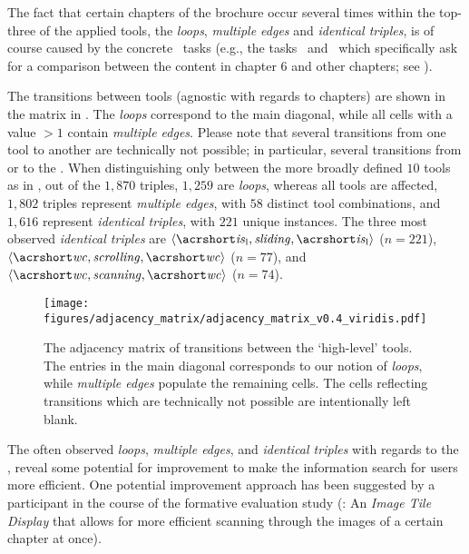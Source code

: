 The fact that certain chapters of the brochure occur several times within the top-three of the applied tools, the \emph{loops}, \emph{multiple edges} and \emph{identical triples}, is of course caused by the concrete \cwt\ tasks (e.g., the tasks \taskTibThree\ and \taskIsTwo\ which specifically ask for a comparison between the content in chapter 6 and other chapters; see ). 


The transitions between tools (agnostic with regards to chapters) are shown in the matrix in . 
%
The \emph{loops} correspond to the main diagonal, while all cells with a value $> 1$ contain \emph{multiple edges}. 
%
Please note that several transitions from one tool to another are technically not possible; in particular, several transitions from or to the \isL. 
%
When distinguishing only between the more broadly defined $10$ tools as in , out of the $1,870$ triples, $1,259$ are \emph{loops}, whereas all tools are affected, $1,802$ triples represent \emph{multiple edges}, with $58$ distinct tool combinations, and $1,616$ represent \emph{identical triples}, with $221$ unique instances. 
%
The three most observed \emph{identical triples} are 
$\langle \mathit{\isL}, \mathit{sliding}, \mathit{\isL} \rangle$ ($n = 221$), 
$\langle \mathit{\wc}, \mathit{scrolling}, \mathit{\wc} \rangle$ ($n = 77$), and 
$\langle \mathit{\wc}, \mathit{scanning}, \mathit{\wc} \rangle$ ($n = 74$). 

\mediumwidth
\begin{figure}[ht!]
    \centering
    \texttt{[image: figures/adjacency\_matrix/adjacency\_matrix\_v0.4\_viridis.pdf]}
    \caption{
    The adjacency matrix of transitions between the `high-level' tools. 
    The entries in the main diagonal corresponds to our notion of \emph{loops}, while \emph{multiple edges} populate the remaining cells.
    The cells reflecting transitions which are technically not possible are intentionally left blank.
    }
    \label{fig:adjacency-matrix}
\end{figure}



The often observed \emph{loops}, \emph{multiple edges}, and \emph{identical triples} with regards to the 
\emph{\isL}, reveal some potential for improvement to make the information search for users more efficient. 
%
One potential improvement approach has been suggested by a participant in the course of the formative evaluation study (\emph{\POne}: An \emph{Image Tile Display} that allows for more efficient scanning through the images of a certain chapter at once).
%



